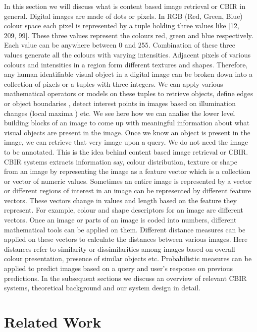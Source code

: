 \documentclass[english]{tktltiki}
\begin{document}
In this section we will discuss what is content based image retrieval or CBIR in general. Digital images are made of dots or pixels. In  RGB (Red, Green, Blue) colour space each pixel is represented by a tuple holding three values like [12, 209, 99]. These three values represent the colours red, green and blue respectively. Each value can be anywhere between 0 and 255. Combination of these three values generate all the colours with varying intensities. Adjacent pixels of various colours and intensities in a region form different textures and shapes. Therefore, any human identifiable visual object in a digital image can be broken down into a collection of pixels or a tuples with three integers. We can apply various mathematical operators or models on these tuples to retrieve objects, define edges or object boundaries \cite{canny}, detect interest points in images based on illumination changes (local maxima \cite{sift}) etc. We see here how we can analise the lower level building blocks of an image to come up with meaningful information about what visual objects are present in the image. Once we know an object is present in the image, we can retrieve that very image upon a query. We do not need the image to be annotated. This is the idea behind content based image retrieval or CBIR. CBIR systems extracts information say, colour distribution, texture or shape from an image by representing the image as a feature vector which is a collection or vector of numeric values. Sometimes an entire image is represented by a vector or different regions of interest in an image can be represented by different feature vectors. These vectors change in values and length based on the feature they represent. For example, colour and shape descriptors for an image are different vectors. Once an image or parts of an image is coded into numbers, different mathematical tools can be applied on them. Different distance measures can be applied on these vectors to calculate the distances between various images. Here distances refer to similarity or dissimilarities among images based on overall colour presentation, presence of similar objects etc. Probabilistic measures can be applied to predict images based on a query and user's response on previous predictions. In the subsequent sections we discuss an overview of relevant CBIR systems, theoretical background and our system design in detail.

\section{Related Work}
\end{document}
